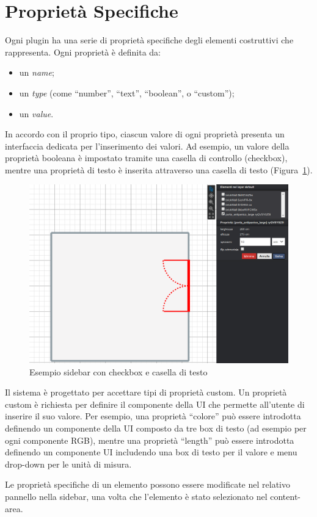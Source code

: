 \section{Propriet\`a Specifiche}
\label{sec:chapter_3_section_3}

\noindent

Ogni plugin ha una serie di proprietà specifiche degli elementi costruttivi che rappresenta.
Ogni propriet\`a \`e definita da:
\begin{itemize}
  \item un \emph{name};
  \item un \emph{type} (come ``number'', ``text'', ``boolean'', o ``custom'');
  \item un \emph{value}.
\end{itemize}
In accordo con il proprio tipo, ciascun valore di ogni proprietà presenta un interfaccia dedicata per l'inserimento dei valori.
Ad esempio, un valore della proprietà booleana è impostato tramite una casella di controllo (checkbox),
mentre una proprietà di testo è inserita attraverso una casella di testo (Figura~\ref{fig:dettaglio}).

\begin{figure}[htbp] %
   \centering
   \includegraphics[width=1\linewidth]{images/dettaglio}
   \caption{Esempio sidebar con checkbox e casella di testo}
   \label{fig:dettaglio}
   \end{figure}
\newpage

Il sistema \`e progettato per accettare tipi di propriet\`a custom. Un propriet\`a custom è richiesta per definire
il componente della UI che permette all'utente di inserire il suo valore.
Per esempio, una propriet\`a ``colore'' pu\`o essere introdotta definendo un componente della UI composto da tre box di testo
(ad esempio per ogni componente RGB), mentre una propriet\`a ``length'' pu\`o essere introdotta definendo un componente UI
includendo una box di testo per il valore e menu drop-down per le unità di misura.

Le propriet\`a specifiche di un elemento possono essere modificate nel relativo pannello nella sidebar, una volta che l'elemento
\`e stato selezionato nel content-area.
\newpage
